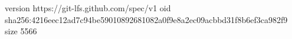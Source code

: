 version https://git-lfs.github.com/spec/v1
oid sha256:4216eec12ad7c94be59010892681082a0f9e8a2ec09acbbd31f8b6ef3ca982f9
size 5566
